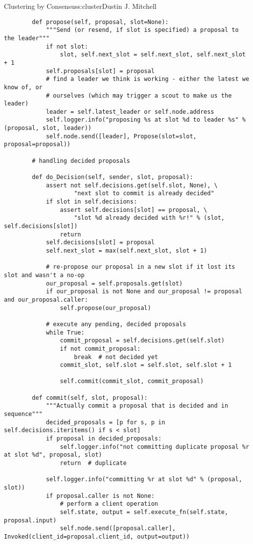 \begin{aosachapter}{Clustering by Consensus}{s:cluster}{Dustin J. Mitchell}
\begin{verbatim}
        def propose(self, proposal, slot=None):
            """Send (or resend, if slot is specified) a proposal to the leader"""
            if not slot:
                slot, self.next_slot = self.next_slot, self.next_slot + 1
            self.proposals[slot] = proposal
            # find a leader we think is working - either the latest we know of, or
            # ourselves (which may trigger a scout to make us the leader)
            leader = self.latest_leader or self.node.address
            self.logger.info("proposing %s at slot %d to leader %s" % (proposal, slot, leader))
            self.node.send([leader], Propose(slot=slot, proposal=proposal))
    
        # handling decided proposals
    
        def do_Decision(self, sender, slot, proposal):
            assert not self.decisions.get(self.slot, None), \
                    "next slot to commit is already decided"
            if slot in self.decisions:
                assert self.decisions[slot] == proposal, \
                    "slot %d already decided with %r!" % (slot, self.decisions[slot])
                return
            self.decisions[slot] = proposal
            self.next_slot = max(self.next_slot, slot + 1)
    
            # re-propose our proposal in a new slot if it lost its slot and wasn't a no-op
            our_proposal = self.proposals.get(slot)
            if our_proposal is not None and our_proposal != proposal and our_proposal.caller:
                self.propose(our_proposal)
    
            # execute any pending, decided proposals
            while True:
                commit_proposal = self.decisions.get(self.slot)
                if not commit_proposal:
                    break  # not decided yet
                commit_slot, self.slot = self.slot, self.slot + 1
    
                self.commit(commit_slot, commit_proposal)
    
        def commit(self, slot, proposal):
            """Actually commit a proposal that is decided and in sequence"""
            decided_proposals = [p for s, p in self.decisions.iteritems() if s < slot]
            if proposal in decided_proposals:
                self.logger.info("not committing duplicate proposal %r at slot %d", proposal, slot)
                return  # duplicate
    
            self.logger.info("committing %r at slot %d" % (proposal, slot))
            if proposal.caller is not None:
                # perform a client operation
                self.state, output = self.execute_fn(self.state, proposal.input)
                self.node.send([proposal.caller], Invoked(client_id=proposal.client_id, output=output))
    

\end{verbatim}
\end{aosachapter}
